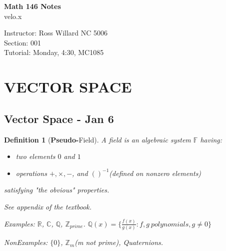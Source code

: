 \documentclass[12pt]{article}
\newtheorem{definition}{Definition}[subsection]
\begin{document}
\begin{titlepage}
\begin{center}
	\textbf{\large Math 146  Notes}\\[1ex]
	\large{velo.x}\\ 
\end{center}
\vfill
Instructor: Ross Willard NC 5006\\
Section: 001\\
Tutorial: Monday, 4:30, MC1085
\end{titlepage}
\newpage


\tableofcontents\label{toc}

\newpage



\section{VECTOR SPACE}
\subsection{Vector Space - Jan 6}
	\begin{definition}[\textbf{Pseudo-}Field]
		A field is an algebraic system $\mathbb{F}$ having:
		\begin{itemize}
			\item two elements $0$ and $1$
			\item operations $+, \times, -$, and $()^{-1}$(defined on nonzero 
				elements)
		\end{itemize}
		satisfying "the obvious" properties.
	
		See appendix of the textbook.

		Examples: $\mathbb{R}$, $\mathbb{C}$, $\mathbb{Q}$, $\mathbb{Z}_{prime}$.
		$\mathbb{Q}(x) = \{\frac{f(x)}{g(x)}:f,g\ polynomials, g\neq 0\}$

		NonExamples: $\{0\}$, $\mathbb{Z}_m$(m not prime), Quaternions. \\
	\end{definition}
	
\end{document}
